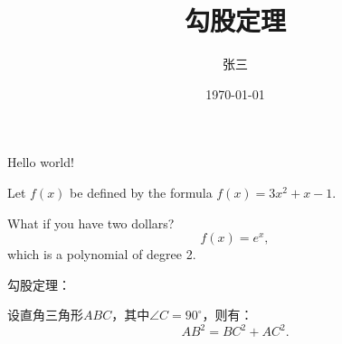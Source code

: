 \documentclass{article}%
\title{\heiti 勾股定理}%
\author{\kaishu 张三}
\date{\today}
\newcommand\degree{^\circ}
\begin{document}
	\maketitle
	
	Hello world!
	
	Let $f(x)$ be defined by the formula
	$f(x) = 3x^2+x-1$.
	
	What if you have two dollars?
	$$f(x) = e^x,$$which is a polynomial of degree 2.
	
	勾股定理：
	
	设直角三角形$ABC$，其中$\angle C=90\degree $，则有：
	\begin{equation} %
		AB^2 = BC^2 + AC^2.
	\end{equation}
	
\end{document}
